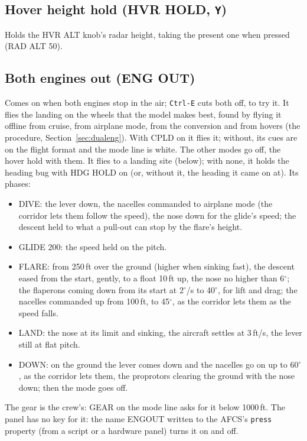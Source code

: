\documentclass[11pt,a4paper,oneside]{book}
\newcommand{\key}[1]{\texttt{#1}}
\newcommand{\ann}[1]{\textsf{#1}}
\begin{document}
\subsection{Hover height hold (HVR HOLD, \key{Y})}
Holds the HVR ALT knob's radar height, taking the present one when pressed (\ann{RAD ALT 50}).

\subsection{Both engines out (ENG OUT)}\label{sec:engout}
Comes on when both engines stop in the air; \key{Ctrl-E} cuts both off, to try it. It flies the landing on the wheels
that the model makes best, found by flying it offline from cruise, from airplane mode, from the conversion and from
hovers (the procedure, Section~\ref{sec:dualeng}). With CPLD on it flies it; without, its cues are on the flight
format and the mode line is white. The other modes go off, the hover hold with them. It flies to a landing site
(below); with none, it holds the heading bug with HDG HOLD on (or, without it, the heading it came on at). Its
phases:
\begin{itemize}
\item \ann{DIVE}: the lever down, the nacelles commanded to airplane mode (the corridor lets them follow the speed),
the nose down for the glide's speed; the descent held to what a pull-out can stop by the flare's height.
\item \ann{GLIDE 200}: the speed held on the pitch.
\item \ann{FLARE}: from 250\,ft over the ground (higher when sinking fast), the descent eased from the start, gently,
to a float 10\,ft up, the nose no higher than 6$^\circ$; the flaperons coming down from its start at 2$^\circ$/s to
40$^\circ$, for lift and drag; the nacelles commanded up from 100\,ft, to 45$^\circ$, as the corridor lets them as the
speed falls.
\item \ann{LAND}: the nose at its limit and sinking, the aircraft settles at 3\,ft/s, the lever still at flat pitch.
\item \ann{DOWN}: on the ground the lever comes down and the nacelles go on up to 60$^\circ$, as the corridor lets
them, the proprotors clearing the ground with the nose down; then the mode goes off.
\end{itemize}
The gear is the crew's: \ann{GEAR} on the mode line asks for it below 1000\,ft. The panel has no key for it: the
name ENGOUT written to the AFCS's \texttt{press} property (from a script or a hardware panel) turns it on and off.
\end{document}
